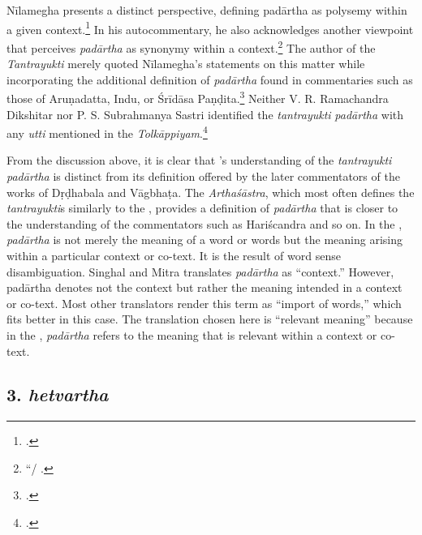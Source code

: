 Nīlamegha presents a distinct perspective, 
defining padārtha as polysemy within a given context.\footnote{
	 \cite[4][4]{muth-1976}.} 
In his autocommentary, he also acknowledges another viewpoint 
that perceives \emph{padārtha} as synonymy within a context.\footnote{
	 “/
	\cite[5]{muth-1976}.} 
The author of the \emph{Tantrayukti} merely quoted Nīlamegha's statements on this matter 
while incorporating the additional definition of \emph{padārtha} 
found in commentaries such as those of Aruṇadatta, Indu, or Śrīdāsa Paṇḍita.\footnote{
	\begin{verse}
	\end{verse}
	\cite[8--10]{nara-1949}.}
Neither V. R. Ramachandra Dikshitar nor P. S. Subrahmanya Sastri 
identified the \emph{tantrayukti} \emph{padārtha} with any \emph{utti} 
mentioned in the \emph{Tolkāppiyam}.\footcite[84]{chev-2009}

From the discussion above, it is clear that \SS 's understanding 
of the \emph{tantrayukti} \emph{padārtha} is distinct from its definition 
offered by the later commentators of the works of Dṛḍhabala and Vāgbhaṭa. 
The \emph{Arthaśāstra}, 
which most often defines the \emph{tantrayukti}s similarly to the \SS, 
provides a definition of \emph{padārtha} that is closer 
to the understanding of the commentators such as Hariścandra and so on. 
In the \SS, \emph{padārtha} is not merely the meaning of a word or words 
but the meaning arising within a particular context or co-text. 
It is the result of word sense disambiguation. 
Singhal and Mitra translates \emph{padārtha} as “context.” 
However, padārtha denotes not the context but rather the meaning intended in a context or co-text. 
Most other translators render this term as “import of words,” 
which fits better in this case. 
The translation chosen here is “relevant meaning” 
because in the \SS, \emph{padārtha} refers to the meaning 
that is relevant within a context or co-text.

\subsection{3. \emph{hetvartha}}


